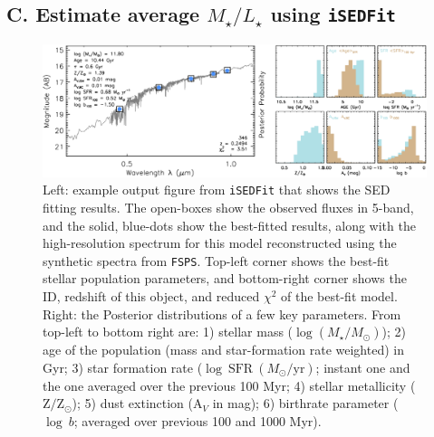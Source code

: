 \documentclass{emulateapj}
\def\logms{{$\log (M_{\star}/M_{\odot})$}}
\begin{document}
\begin{CJK*}{UTF8}{gbsn}

\section{C. Estimate average {$M_{\star}/L_{\star}$} using \texttt{iSEDFit}} 
    \label{app:B}

    \begin{figure}[bt!]
        \begin{center}
        \includegraphics[width=\textwidth]{fig/redbcg_isedfit_example.pdf}
        \caption{Left: example output figure from \texttt{iSEDFit} that shows the SED 
        	fitting results. 
            The open-boxes show the observed fluxes in 5-band, and the solid, blue-dots
            show the best-fitted results, along with the high-resolution spectrum for
            this model reconstructed using the synthetic spectra from \texttt{FSPS}. 
            Top-left corner shows the best-fit stellar population parameters, and 
            bottom-right corner shows the ID, redshift of this object, and reduced 
            $\chi^2$ of the best-fit model.~~~
            Right: the Posterior distributions of a few key parameters.
            From top-left to bottom right are: 1) stellar mass (\logms{}); 2) age of the 
            population (mass and star-formation rate weighted) in Gyr; 3) star formation 
            rate ($\log\ \mathrm{SFR}\ (M_{\odot}/\mathrm{yr})$; instant one and the one 
            averaged over the previous 100 Myr; 4) stellar metallicity 
            ($\mathrm{Z}/\mathrm{Z}_{\odot}$); 5) dust extinction ($\mathrm{A}_V$ in mag);
            6) birthrate parameter ($\log\ b$; averaged over previous 100 and 1000 Myr).}
        \label{fig:ised}
        \end{center}
    \end{figure}


\end{CJK*}
\end{document}
